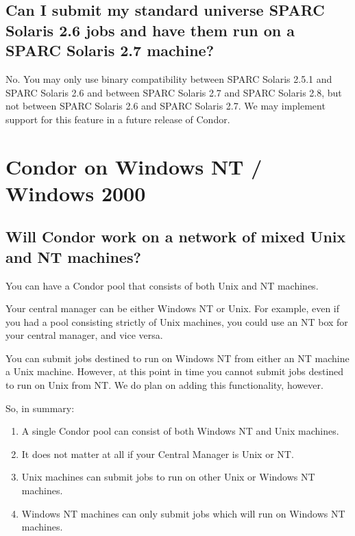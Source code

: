 \subsection{Can I submit my standard universe SPARC Solaris 2.6 jobs
and have them run on a SPARC Solaris 2.7 machine?}

No. You may only use binary compatibility between SPARC Solaris 2.5.1
and SPARC Solaris 2.6 and between SPARC Solaris 2.7 and SPARC Solaris
2.8, but not between SPARC Solaris 2.6 and SPARC Solaris 2.7.  We may
implement support for this feature in a future release of Condor.

\section{Condor on Windows NT / Windows 2000}

\subsection{Will Condor work on a network of mixed Unix and NT machines?}

You can have a Condor pool that consists of both Unix and NT machines.

Your central manager can be either Windows NT or Unix.  For example,
even if you had a pool consisting strictly of Unix machines, you could
use an NT box for your central manager, and vice versa.

You can submit jobs destined to run on Windows NT from either an NT
machine  a Unix machine.  However, at this point in time you
cannot submit jobs destined to run on Unix from NT.  We do plan on
adding this functionality, however.

So, in summary:

\begin{enumerate}

\item{A single Condor pool can consist of both Windows NT and Unix
machines.}

\item{It does not matter at all if your Central Manager is Unix or NT.}

\item{Unix machines can submit jobs to run on other Unix or Windows NT
machines.}

\item{Windows NT machines can only submit jobs which will run on Windows
NT machines.}

\end{enumerate}

